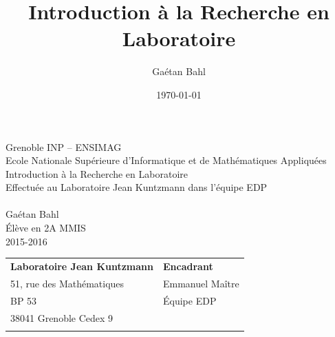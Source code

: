 \documentclass[12pt,a4paper,twoside]{article}
\title{Introduction à la Recherche en Laboratoire}
\author{Gaétan Bahl}
\date{\today}
\begin{document}
\lstset{ numbers=left, tabsize=3, frame=single, numberstyle=\ttfamily, basicstyle=\footnotesize} 
\thispagestyle{empty}

\begin{center}
Grenoble INP  -- ENSIMAG\\
Ecole Nationale Supérieure d'Informatique et de Mathématiques Appliquées\\
\vspace{3cm}
{\LARGE Introduction à la Recherche en Laboratoire}\\
\vspace{1cm}
Effectuée au Laboratoire Jean Kuntzmann dans l'équipe EDP\\
\vspace{2cm}
\\
\vspace{2cm}
Gaétan Bahl\\
Élève en 2A MMIS\\
\vspace{3mm}
2015-2016\\
\vspace{2,5cm}
\begin{tabular}{p{10cm}p{10cm}}
{\bf Laboratoire Jean Kuntzmann}                                            &{\bf Encadrant}\\
{\footnotesize 51, rue des Mathématiques}     & Emmanuel Maître\\
{\footnotesize BP 53}      	& {\footnotesize Équipe EDP }\\
  {\footnotesize 38041 Grenoble Cedex 9}			& \\
{} 		 & {} \\		
\end{tabular}
\end{center}
\end{document}
